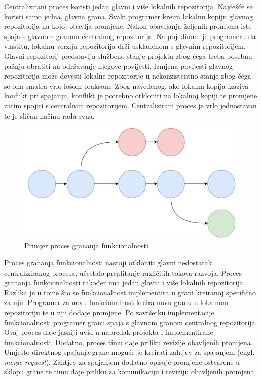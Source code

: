 \documentclass[times, utf8, diplomski, numeric]{fer}
\newcommand{\eng}[1]{(engl. \textit{#1})}
\begin{document}
Centralizirani proces koristi jedan glavni i više lokalnih repozitorija. Najčešće se koristi samo jedna, glavna grana. Svaki programer kreira lokalnu kopiju glavnog repozitorija na kojoj obavlja promjene. Nakon obavljanja željenih promjena iste spaja s glavnom granom centralnog repozitorija. Na pojedinom je programeru da vlastitu, lokalnu verziju repozitorija drži usklađenom s glavnim repozitorijem. Glavni repozitorij predstavlja službeno stanje projekta zbog čega treba posebnu pažnju obratiti na održavanje njegove povijesti. Izmjena povijesti glavnog repozitorija može dovesti lokalne repozitorije u nekonzistentno stanje zbog čega se ona smatra vrlo lošom praksom. Zbog navedenog, ako lokalna kopija izaziva konflikt pri spajanju, konflikt je potrebno otkloniti na lokalnoj kopiji te promjene zatim spojiti s centralnim repozitorijem. Centralizirani proces je vrlo jednostavan te je sličan načinu rada svna.

\begin{figure}[b]
\centering
\includegraphics[scale=0.5]{FeatureBranch}
\caption{Primjer proces grananja funkcionalnosti}
\label{fig:FeatureBranch}
\end{figure}

Proces grananja funkcionalnosti nastoji otkloniti glavni nedostatak centraliziranog procesa, učestalo preplitanje različitih tokova razvoja. Proces grananja funkcionalnosti također ima jedan glavni i više lokalnih repozitorija. Razlika je u tome što se funkcionalnost implementira u grani kreiranoj specifično za nju. Programer za novu funkcionalnost kreira novu granu u lokalnom repozitoriju te u nju dodaje promjene. Po završetku implementacije funkcionalnosti programer granu spaja s glavnom granom centralnog repozitorija. Ovaj proces daje jasniji uvid u napredak projekta i implementirane funkcionalnosti. Dodatno, proces timu daje priliku revizije obavljenih promjena. Umjesto direktnog spajanja grane moguće je kreirati zahtjev za spajanjem \eng{merge request}. Zahtjev za spajanjem dodatno opisuje promjene ostvarene u sklopu grane te timu daje priliku za komunikaciju i reviziju obavljenih promjena.
\end{document}
